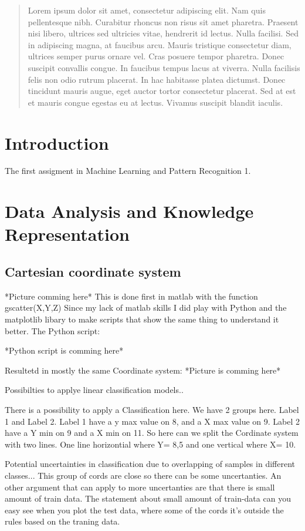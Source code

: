 \documentclass[a4paper,12pt,pdftex]{article}
\begin{document}
\begin{abstract}

Lorem ipsum dolor sit amet, consectetur adipiscing elit. Nam quis pellentesque
nibh. Curabitur rhoncus non risus sit amet pharetra. Praesent nisi libero,
ultrices sed ultricies vitae, hendrerit id lectus. Nulla facilisi. Sed in
adipiscing magna, at faucibus arcu. Mauris tristique consectetur diam, ultrices
semper purus ornare vel. Cras posuere tempor pharetra. Donec suscipit convallis
congue. In faucibus tempus lacus at viverra. Nulla facilisis felis non odio
rutrum placerat. In hac habitasse platea dictumst. Donec tincidunt mauris
augue, eget auctor tortor consectetur placerat. Sed at est et mauris congue
egestas eu at lectus. Vivamus suscipit blandit iaculis. 

\end{abstract}

\section{Introduction}
The first assigment in Machine Learning and Pattern Recognition 1. 

\section{Data Analysis and Knowledge Representation}
\subsection{Cartesian coordinate system}
*Picture comming here*
This is done first in matlab with the function gscatter(X,Y,Z)
Since my lack of matlab skills I did play with Python and the matplotlib libary to make scripts that show the same thing
to understand it better. The Python script:

*Python script is comming here*


Resultetd in mostly the same Coordinate system:
*Picture is comming here*

Possibilties to applye linear classification models..

There is a possibility to apply a Classification here. We have 2 groups here. Label 1 and Label 2. Label 1 have a y max value on
8, and a X max value on 9. Label 2 have a Y min on 9 and a X min on 11. So here can we split the Cordinate system with two lines.
One line horizontial where Y= 8,5 and one vertical where X= 10. 

Potential uncertainties in classification due to overlapping of samples in different classes...
This group of cords are close so there can be some uncertanties. An other argument that can apply to more uncertanties are
that there is small amount of train data. The statement about small amount of train-data can you easy see when you plot the test data, 
where some of the cords it's outside the rules based on the traning data. 
\end{document}

